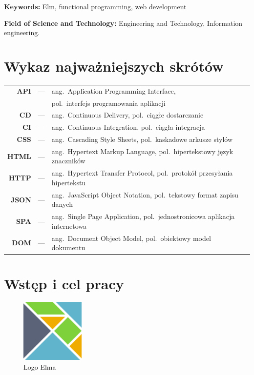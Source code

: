 \documentclass[twoside,a4paper]{report}
\begin{document}
\textbf{Keywords:} Elm, functional programming, web development

\textbf{Field of Science and Technology:} Engineering and Technology, Information engineering.


\tableofcontents


\chapter*{Wykaz najważniejszych skrótów}
\begin{tabular}{rcl}
    \textbf{API} &---& ang.~Application Programming Interface,\\
                 &   & pol.~interfejs programowania aplikacji\\
    \textbf{CD} &---& ang.~Continuous Delivery, pol.~ciągłe dostarczanie\\
    \textbf{CI} &---& ang.~Continuous Integration, pol.~ciągła integracja\\
    \textbf{CSS} &---& ang.~Cascading Style Sheets, pol.~kaskadowe arkusze stylów\\
    \textbf{HTML} &---& ang.~Hypertext Markup Language, pol.~hipertekstowy język znaczników\\
    \textbf{HTTP} &---& ang.~Hypertext Transfer Protocol, pol.~protokół przesyłania hipertekstu\\
    \textbf{JSON} &---& ang.~JavaScript Object Notation, pol.~tekstowy format zapisu danych\\
    \textbf{SPA} &---& ang.~Single Page Application, pol.~jednostronicowa aplikacja internetowa\\
    \textbf{DOM} &---& ang.~Document Object Model, pol.~obiektowy model dokumentu\\
\end{tabular}


\chapter{Wstęp i cel pracy}
\begin{figure}
    \centering
    \includegraphics[width=0.28\textwidth]{img/elm_logo.png}
    \caption*{Logo Elma}\label{fig:elm_logo}
\end{figure}
\end{document}
